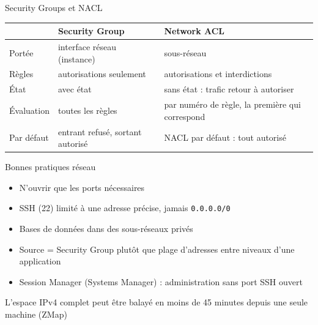 \begin{frame}{Security Groups et NACL}
  \renewcommand{\arraystretch}{1.4}
  \begin{tabularx}{\textwidth}{@{}>{\raggedright\arraybackslash}p{3.4cm}>{\raggedright\arraybackslash}X>{\raggedright\arraybackslash}X@{}}
    \toprule
    & \textbf{Security Group} & \textbf{Network ACL} \\ \midrule
    Portée & interface réseau (instance) & sous-réseau \\
    Règles & autorisations seulement & autorisations et interdictions \\
    État & avec état & sans état : trafic retour à autoriser \\
    Évaluation & toutes les règles & par numéro de règle, la première qui correspond \\
    Par défaut & entrant refusé, sortant autorisé & NACL par défaut : tout autorisé \\ \bottomrule
  \end{tabularx}
\end{frame}

\begin{frame}{Bonnes pratiques réseau}
  \begin{itemize}
    \setlength{\itemsep}{.5em}
    \item N'ouvrir que les ports nécessaires
    \item SSH (22) limité à une adresse précise, jamais \texttt{0.0.0.0/0}
    \item Bases de données dans des sous-réseaux privés
    \item Source = Security Group plutôt que plage d'adresses entre niveaux d'une application
    \item Session Manager (Systems Manager) : administration sans port SSH ouvert
  \end{itemize}
  \bigskip
  \attention L'espace IPv4 complet peut être balayé en moins de 45 minutes depuis une seule machine (ZMap)
\end{frame}


